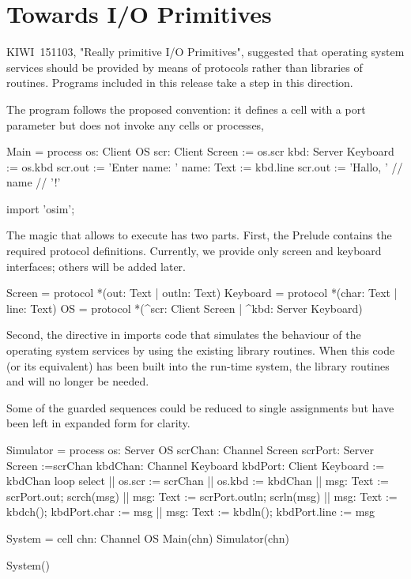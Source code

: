 \documentclass{scrartcl}
\begin{document}
\section{Towards I/O Primitives}

KIWI~151103, "Really primitive I/O Primitives", suggested that operating system services should be provided by means of protocols rather than libraries of routines.  Programs included in this release take a step in this direction.

The program  follows the proposed convention: it defines a cell  with a port parameter but does not invoke any cells or processes,
\begin{code}
Main = process os: Client OS
{
    scr: Client Screen := os.scr
    kbd: Server Keyboard := os.kbd
    scr.out := 'Enter name: '
    name: Text := kbd.line
    scr.out := 'Hallo, ' // name // '!'
}

import 'osim';
\end{code}

The magic that allows  to execute has two parts.  First, the Prelude contains the required protocol definitions.  Currently, we provide only screen and keyboard interfaces; others will be added later.
\begin{code}
Screen = protocol { *(out: Text | outln: Text) }
Keyboard = protocol { *(char: Text | line: Text) }
OS = protocol {*(^scr: Client Screen | ^kbd: Server Keyboard) }
\end{code}

Second, the  directive in  imports code that simulates the behaviour of the operating system services by using the existing library routines.  When this code (or its equivalent) has been built into the run-time system, the library routines and  will no longer be needed.

Some of the guarded sequences could be reduced to single assignments but have been left in expanded form for clarity.
\begin{code}
Simulator = process os: Server OS
{
    scrChan: Channel Screen
    scrPort: Server Screen :=scrChan
    kbdChan: Channel Keyboard
    kbdPort: Client Keyboard := kbdChan
    loop select
    {
        || os.scr := scrChan
        || os.kbd := kbdChan
        || msg: Text := scrPort.out; 
           scrch(msg)
        || msg: Text := scrPort.outln; 
           scrln(msg)
        || msg: Text := kbdch(); 
           kbdPort.char := msg
        || msg: Text := kbdln(); 
           kbdPort.line := msg
    }
}

System = cell
{
    chn: Channel OS
    Main(chn)
    Simulator(chn)
}

System()
\end{code}
\end{document}
